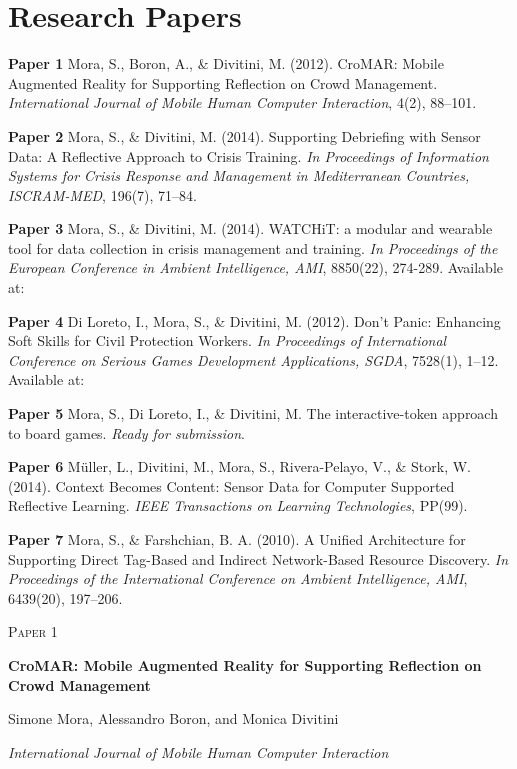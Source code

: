 \chapter{Research Papers}\label{papers}

\textbf{Paper 1} Mora, S., Boron, A., \& Divitini, M. (2012). CroMAR:
Mobile Augmented Reality for Supporting Reflection on Crowd Management.
\emph{International Journal of Mobile Human Computer Interaction}, 4(2),
88--101. 

\textbf{Paper 2} Mora, S., \& Divitini, M. (2014). Supporting Debriefing
with Sensor Data: A Reflective Approach to Crisis Training. \emph{In
Proceedings of Information Systems for Crisis Response and Management in
Mediterranean Countries, ISCRAM-MED}, 196(7), 71--84. 

\textbf{Paper 3} Mora, S., \& Divitini, M. (2014). WATCHiT: a modular
and wearable tool for data collection in crisis management and training.
\emph{In Proceedings of the European Conference in Ambient Intelligence,
AMI}, 8850(22), 274-289. Available at:

\textbf{Paper 4} Di Loreto, I., Mora, S., \& Divitini, M. (2012). Don't
Panic: Enhancing Soft Skills for Civil Protection Workers. \emph{In
Proceedings of International Conference on Serious Games Development
Applications, SGDA}, 7528(1), 1--12. Available at:

\textbf{Paper 5} Mora, S., Di Loreto, I., \& Divitini, M. The
interactive-token approach to board games. \emph{Ready for submission}.

\textbf{Paper 6} Müller, L., Divitini, M., Mora, S., Rivera-Pelayo, V.,
\& Stork, W. (2014). Context Becomes Content: Sensor Data for Computer
Supported Reflective Learning. \emph{IEEE Transactions on Learning
Technologies}, PP(99). 

\textbf{Paper 7} Mora, S., \& Farshchian, B. A. (2010). A Unified
Architecture for Supporting Direct Tag-Based and Indirect Network-Based
Resource Discovery. \emph{In Proceedings of the International Conference
on Ambient Intelligence, AMI}, 6439(20), 197--206. 

\cleardoublepage
\begin{flushright}
\textsc{\huge Paper 1}
\end{flushright}
\vspace{3cm}
\begin{center}
	\begin{framed}
		{\Large \textbf{CroMAR: Mobile Augmented Reality for Supporting Reflection on Crowd Management}}	
		\medskip
		
		Simone Mora, Alessandro Boron, and Monica Divitini
		
		\medskip		
		\emph{International Journal of Mobile Human Computer Interaction}
	\end{framed}	
\end{center}
\cleardoublepage



